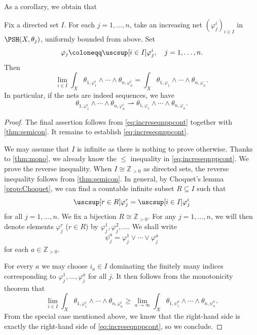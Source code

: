 As a corollary, we obtain that
\begin{corollary}\label{cor:incseqnppcont}
Fix a directed set $I$.
    For each $j=1,\ldots,n$, take an increasing net $(\varphi_j^i)_{i\in I}$ in $\PSH(X,\theta_j)$, uniformly bounded from above. Set
    \[
    \varphi_j\coloneqq \uscsup[i\in I] \varphi_j^i,\quad j=1,\ldots,n.
    \]
    Then
    \begin{equation}\label{eq:increseqnppcont}
    \lim_{i\in I}\int_X \theta_{1,\varphi_1^i}\wedge \cdots \wedge \theta_{n,\varphi_n^i} = \int_X \theta_{1,\varphi_1}\wedge \cdots \wedge \theta_{n,\varphi_n}.
\end{equation}
In particular, if the nets are indeed sequences, we have
\[
\theta_{1,\varphi_1^i}\wedge \cdots \wedge \theta_{n,\varphi_n^i} \rightharpoonup \theta_{1,\varphi_1}\wedge \cdots \wedge \theta_{n,\varphi_n}.
\]
\end{corollary}
\begin{proof}
The final assertion follows from \eqref{eq:increseqnppcont} together with \cref{thm:semicon}. It remains to establish \eqref{eq:increseqnppcont}.

We may assume that $I$ is infinite as there is nothing to prove otherwise. Thanks to \cref{thm:mono}, we already know the $\leq$ inequality in \eqref{eq:increseqnppcont}. We prove the reverse inequality.
When $I\cong\mathbb{Z}_{>0}$ as directed sets, the reverse inequality follows from \cref{thm:semicon}. In general, by Choquet's lemma \cref{prop:Choquet}, we can find a countable infinite subset $R\subseteq I$ such that
\[
\uscsup[r\in R]\varphi^r_j=\uscsup[i\in I]\varphi^i_j
\]
for all $j=1,\ldots,n$.
We fix a bijection $R\cong \mathbb{Z}_{>0}$. For any $j=1,\ldots,n$, we will then denote elements $\varphi_j^r$ ($r\in R$) by $\varphi_j^1,\varphi_j^2,\dots$. We shall write
\[
\psi_j^a=\varphi_j^1\lor \cdots \lor \varphi_j^a
\]
for each $a\in \mathbb{Z}_{>0}$.

For every $a$ we may choose $i_a\in I$ dominating the finitely many indices corresponding to $\varphi_j^1,\ldots,\varphi_j^a$ for all $j$. It then follows from the monotonicity theorem that
\[
\lim_{i\in I}\int_X \theta_{1,\varphi_1^i}\wedge \cdots \wedge \theta_{n,\varphi_n^i}\geq \lim_{a\to \infty}\int_X \theta_{1,\psi_1^a}\wedge \cdots \wedge \theta_{n,\psi_n^a}.
\]
From the special case mentioned above, we know that the right-hand side is exactly the right-hand side of \eqref{eq:increseqnppcont}, so we conclude.
\end{proof}


